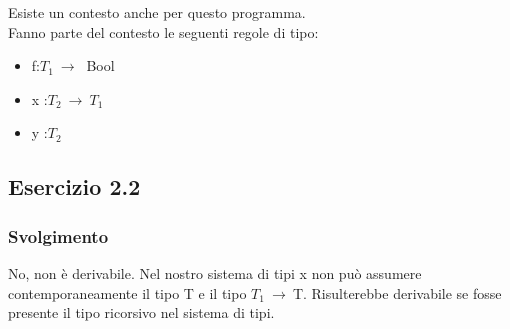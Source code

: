 	Esiste un contesto anche per questo programma. \\
	Fanno parte del contesto le seguenti regole di tipo:
\begin{itemize}
	\item f:$T_1\:\rightarrow\:$ Bool
	\item x :$T_2\:\rightarrow\:T_1$
	\item y :$T_2$
\end{itemize}


\subsection*{Esercizio 2.2}

\subsubsection*{Svolgimento}
 	\begin{prooftree} 
	\end{prooftree} 

No, non \`e derivabile. Nel nostro sistema di tipi x non pu\`o assumere contemporaneamente il tipo T e il tipo $T_1\:\rightarrow\:$T. Risulterebbe derivabile se fosse presente il tipo ricorsivo nel sistema di tipi. \\


